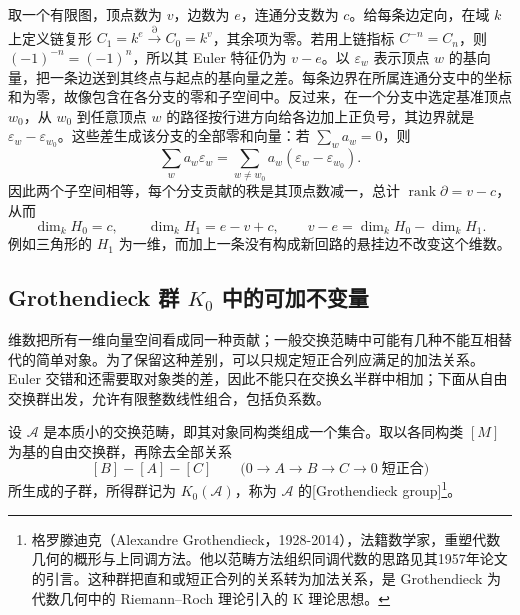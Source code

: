 \begin{example}\label{b4:exm:graph-euler}
	取一个有限图，顶点数为 \(v\)，边数为 \(e\)，连通分支数为 \(c\)。给每条边定向，在域 \(k\) 上定义链复形 \(C_1=k^e\xrightarrow{\partial}C_0=k^v\)，其余项为零。若用上链指标 \(C^{-n}=C_n\)，则 \((-1)^{-n}=(-1)^n\)，所以其 Euler 特征仍为 \(v-e\)。以 \(\varepsilon_w\) 表示顶点 \(w\) 的基向量，把一条边送到其终点与起点的基向量之差。每条边界在所属连通分支中的坐标和为零，故像包含在各分支的零和子空间中。反过来，在一个分支中选定基准顶点 \(w_0\)，从 \(w_0\) 到任意顶点 \(w\) 的路径按行进方向给各边加上正负号，其边界就是 \(\varepsilon_w-\varepsilon_{w_0}\)。这些差生成该分支的全部零和向量：若 \(\sum_w a_w=0\)，则
	\[
		\sum_w a_w\varepsilon_w =\sum_{w\ne w_0}a_w(\varepsilon_w-\varepsilon_{w_0}).
	\]
	因此两个子空间相等，每个分支贡献的秩是其顶点数减一，总计 \(\operatorname{rank}\partial=v-c\)，从而
	\[
		\dim_kH_0=c,\qquad \dim_kH_1=e-v+c, \qquad v-e=\dim_kH_0-\dim_kH_1.
	\]
	例如三角形的 \(H_1\) 为一维，而加上一条没有构成新回路的悬挂边不改变这个维数。
\end{example}

\subsection{\texorpdfstring{Grothendieck 群 \(K_0\) 中的可加不变量}{Grothendieck 群 K0 中的可加不变量}}
\label{b4:subsec:0504:02}

维数把所有一维向量空间看成同一种贡献；一般交换范畴中可能有几种不能互相替代的简单对象。为了保留这种差别，可以只规定短正合列应满足的加法关系。Euler 交错和还需要取对象类的差，因此不能只在交换幺半群中相加；下面从自由交换群出发，允许有限整数线性组合，包括负系数。

\begin{definition}\label{b4:def:grothendieck-group}
	设 \(\mathcal A\) 是本质小的交换范畴，即其对象同构类组成一个集合。取以各同构类 \([M]\) 为基的自由交换群，再除去全部关系
	\[
		[B]-[A]-[C] \qquad\bigl(0\to A\to B\to C\to0\;\text{短正合}\bigr)
	\]
	所生成的子群，所得群记为 \(K_0(\mathcal A)\)，称为 \(\mathcal A\) 的[Grothendieck group]\footnote{格罗滕迪克（Alexandre Grothendieck，1928-2014），法籍数学家，重塑代数几何的概形与上同调方法。他以范畴方法组织同调代数的思路见其1957年论文的引言\cite[Introduction, p. 119]{Grothendieck1957TohokuI}。这种群把直和或短正合列的关系转为加法关系，是 Grothendieck 为代数几何中的 Riemann--Roch 理论引入的 K 理论思想。}。
\end{definition}

